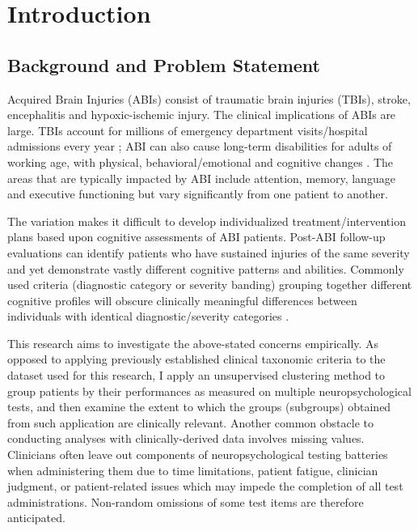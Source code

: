 
\chapter{Introduction}\label{Chapter1}


\section{Background and Problem Statement}
Acquired Brain Injuries (ABIs) consist of traumatic brain injuries (TBIs), stroke, encephalitis and hypoxic-ischemic injury. The clinical implications of ABIs are large. TBIs account for millions of emergency department visits/hospital admissions every year \parencite{maas2017traumatic,brazinova2021epidemiology} ; ABI can also cause long-term disabilities for adults of working age, with physical, behavioral/emotional and cognitive changes \parencite{corrigan2010epidemiology}. The areas that are typically impacted by ABI include attention, memory, language and executive functioning but vary significantly from one patient to another.

The variation makes it difficult to develop individualized treatment/intervention plans based upon cognitive assessments of ABI patients. Post-ABI follow-up evaluations can identify patients who have sustained injuries of the same severity and yet demonstrate vastly different cognitive patterns and abilities. Commonly used criteria (diagnostic category or severity banding) grouping together different cognitive profiles will obscure clinically meaningful differences between individuals with identical diagnostic/severity categories \parencite{saatman2008classification}.

This research aims to investigate the above-stated concerns empirically. As opposed to applying previously established clinical taxonomic criteria to the dataset used for this research, I apply an unsupervised clustering method to group patients by their performances as measured on multiple neuropsychological tests, and then examine the extent to which the groups (subgroups) obtained from such application are clinically relevant. Another common obstacle to conducting analyses with clinically-derived data involves missing values. Clinicians often leave out components of neuropsychological testing batteries when administering them due to time limitations, patient fatigue, clinician judgment, or patient-related issues which may impede the completion of all test administrations. Non-random omissions of some test items are therefore anticipated.

